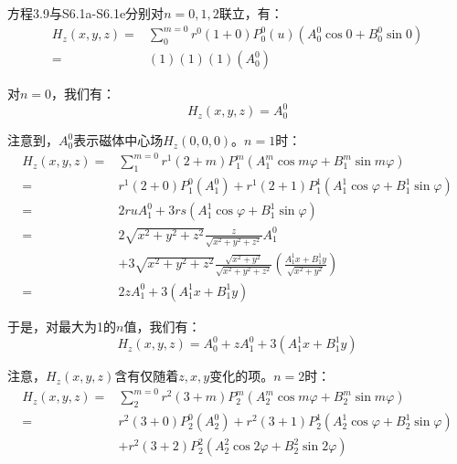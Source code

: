 方程3.9与S6.1a-S6.1e分别对$n=0,1,2$联立，有：
\begin{equation*}%
\begin{split}
H_z(x,y,z)=&\sum_{0}^{m=0}r^0(1+0)P_{0}^{0}(u)(A_{0}^{0}\cos0 +B_{0}^{0}\sin 0)\\
=&(1)(1)(1)(A_{0}^{0})
\end{split}\tag{S6.2}
\end{equation*}

对$n=0$，我们有：
 \begin{equation*}%
H_z(x,y,z)=A_{0}^{0} \tag{3.126a}
\end{equation*}

注意到，$A_0^0$表示磁体中心场$H_z(0, 0, 0)$。$n=1$时：
\begin{equation*}%
\begin{split}
H_z(x,y,z)=&\sum_{1}^{m=0}r^1(2+m)P_{1}^{m}(A_{1}^{m}\cos m\varphi+B_{1}^{m}\sin m\varphi)\\
=&r^1(2+0)P_{1}^{0}(A_{1}^{0})+r^1(2+1)
P_{1}^{1}(A_{1}^{1}\cos\varphi+B_{1}^{1}\sin\varphi)\\
=&2ruA_{1}^{0}+3rs(A_{1}^{1}\cos\varphi+B_{1}^{1}\sin\varphi)\\
=&2\sqrt{x^2+y^2+z^2}\frac{z}{\sqrt{x^2+y^2+z^2}}A_{1}^{0}\\
&+3\sqrt{x^2+y^2+z^2}\frac{\sqrt{x^2+y^2}}{\sqrt{x^2+y^2+z^2}}\left(\frac{A_{1}^{1}x+B_{1}^{1}y}{\sqrt{x^2+y^2}}\right)\\
=&2zA_{1}^{0}+3(A_{1}^{1}x+B_{1}^{1}y)
\end{split}\tag{S6.3}
\end{equation*}

于是，对最大为1的$n$值，我们有：
\begin{equation*}%
H_z(x,y,z)=A_{0}^{0}+zA_{1}^{0}+3(A_{1}^{1}x+B_{1}^{1}y) \tag{3.126b}
\end{equation*}

注意，$H_z(x, y, z)$含有仅随着$z,x,y$变化的项。$n=2$时：%
 \begin{equation*}%
 \begin{split}
H_z(x,y,z)=&\sum_{2}^{m=0}r^2(3+m)P_{2}^{m}(A_{2}^{m}\cos m\varphi+B_{2}^{m}\sin m\varphi)\\
=&r^2(3+0)P_{2}^{0}(A_{2}^{0})+r^2(3+1)P_{2}^{1}
(A_{2}^{1}\cos\varphi+B_{2}^{1}\sin\varphi)\\
&+r^2(3+2)P_{2}^{2}(A_{2}^{2}\cos 2\varphi+B_{2}^{2}\sin 2\varphi)
 \end{split} \tag{S6.4}
\end{equation*}


